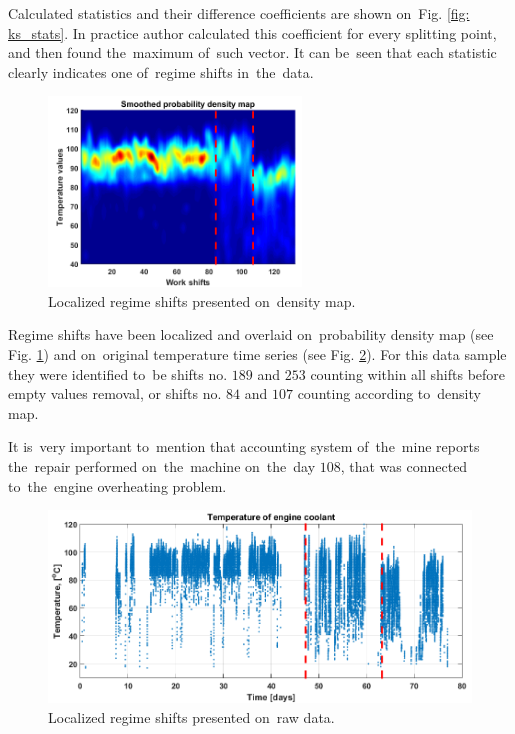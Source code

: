 Calculated statistics and their difference coefficients are shown on~Fig. \ref{fig: ks_stats}. In practice author calculated this coefficient for every splitting point, and then found the~maximum of~such vector. It can be~seen that each statistic clearly indicates one of~regime shifts in~the~data.

\begin{figure}[ht!]
\centering
\includegraphics[width = 0.6\textwidth]{wykresy/ks_map3.png}
\caption{Localized regime shifts presented on~density map.}
\label{fig: ks_map3}
\end{figure}

Regime shifts have been localized and overlaid on~probability density map (see Fig. \ref{fig: ks_map3}) and on~original temperature time series (see Fig. \ref{fig: ks_final}). For this data sample they were identified to~be shifts no. $189$ and $253$ counting within all shifts before empty values removal, or shifts no. $84$ and $107$ counting according to~density map. 

It is~very important to~mention that accounting system of~the~mine reports the~repair performed on~the~machine on~the~day $108$, that was connected to~the~engine overheating problem. 

\begin{figure}[ht!]
\centering
\includegraphics[width = \textwidth]{wykresy/ks_final.png}
\caption{Localized regime shifts presented on~raw data.}
\label{fig: ks_final}
\end{figure}

